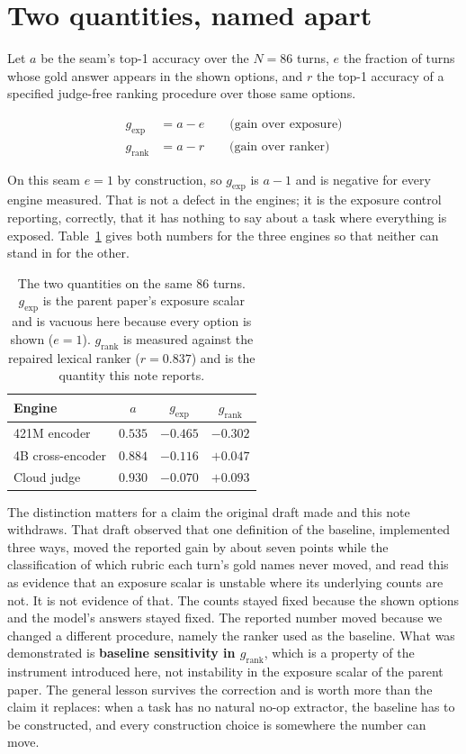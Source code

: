 \documentclass[10pt,twocolumn]{article}
\newcommand{\grank}{$g_{\mathrm{rank}}$}
\newcommand{\gexp}{$g_{\mathrm{exp}}$}
\begin{document}
\section{Two quantities, named apart}\label{sec:naming}
Let $a$ be the seam's top-1 accuracy over the $N=86$ turns, $e$ the fraction of turns whose
gold answer appears in the shown options, and $r$ the top-1 accuracy of a specified
judge-free ranking procedure over those same options.

\begin{align}
g_{\mathrm{exp}} &= a - e \qquad\text{(gain over exposure)}\\
g_{\mathrm{rank}} &= a - r \qquad\text{(gain over ranker)}
\end{align}

On this seam $e=1$ by construction, so \gexp{} is $a-1$ and is negative for every engine
measured. That is not a defect in the engines; it is the exposure control reporting,
correctly, that it has nothing to say about a task where everything is exposed. Table~\ref{tab:quantities}
gives both numbers for the three engines so that neither can stand in for the other.

\begin{table}[t]\centering\small
\caption{The two quantities on the same 86 turns. \gexp{} is the parent paper's exposure
scalar and is vacuous here because every option is shown ($e=1$). \grank{} is measured
against the repaired lexical ranker ($r=0.837$) and is the quantity this note reports.}
\label{tab:quantities}
\begin{tabular}{lccc}
\toprule
Engine & $a$ & \gexp{} & \grank{} \\
\midrule
421M encoder            & $0.535$ & $-0.465$ & $-0.302$ \\
4B cross-encoder        & $0.884$ & $-0.116$ & $+0.047$ \\
Cloud judge             & $0.930$ & $-0.070$ & $+0.093$ \\
\bottomrule
\end{tabular}
\end{table}

The distinction matters for a claim the original draft made and this note withdraws. That
draft observed that one definition of the baseline, implemented three ways, moved the
reported gain by about seven points while the classification of which rubric each turn's
gold names never moved, and read this as evidence that an exposure scalar is unstable where
its underlying counts are not. It is not evidence of that. The counts stayed fixed because
the shown options and the model's answers stayed fixed. The reported number moved because we
changed a different procedure, namely the ranker used as the baseline. What was demonstrated
is \textbf{baseline sensitivity in \grank{}}, which is a property of the instrument
introduced here, not instability in the exposure scalar of the parent paper. The general
lesson survives the correction and is worth more than the claim it replaces: when a task has
no natural no-op extractor, the baseline has to be constructed, and every construction
choice is somewhere the number can move.
\end{document}
